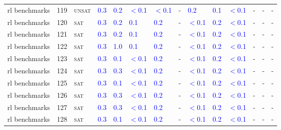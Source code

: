 \begin{center}
{\begin{longtable}{@{}llllllllllllll@{}}
rl benchmarks & 119 & \textsc{unsat} & \textcolor{blue}{0.3} & \textcolor{blue}{0.2} & \textcolor{blue}{$<$0.1} & \textcolor{blue}{$<$0.1} & - & \textcolor{blue}{0.2} & \textcolor{blue}{0.1} & \textcolor{blue}{$<$0.1} & - & - & - \\
rl benchmarks & 120 & \textsc{sat} & \textcolor{blue}{0.3} & \textcolor{blue}{0.2} & \textcolor{blue}{0.1} & \textcolor{blue}{0.2} & - & \textcolor{blue}{$<$0.1} & \textcolor{blue}{0.2} & \textcolor{blue}{$<$0.1} & - & - & - \\
rl benchmarks & 121 & \textsc{sat} & \textcolor{blue}{0.3} & \textcolor{blue}{0.2} & \textcolor{blue}{0.1} & \textcolor{blue}{0.2} & - & \textcolor{blue}{$<$0.1} & \textcolor{blue}{0.2} & \textcolor{blue}{$<$0.1} & - & - & - \\
rl benchmarks & 122 & \textsc{sat} & \textcolor{blue}{0.3} & \textcolor{blue}{1.0} & \textcolor{blue}{0.1} & \textcolor{blue}{0.2} & - & \textcolor{blue}{$<$0.1} & \textcolor{blue}{0.2} & \textcolor{blue}{$<$0.1} & - & - & - \\
rl benchmarks & 123 & \textsc{sat} & \textcolor{blue}{0.3} & \textcolor{blue}{0.1} & \textcolor{blue}{$<$0.1} & \textcolor{blue}{0.2} & - & \textcolor{blue}{$<$0.1} & \textcolor{blue}{0.2} & \textcolor{blue}{$<$0.1} & - & - & - \\
rl benchmarks & 124 & \textsc{sat} & \textcolor{blue}{0.3} & \textcolor{blue}{0.3} & \textcolor{blue}{$<$0.1} & \textcolor{blue}{0.2} & - & \textcolor{blue}{$<$0.1} & \textcolor{blue}{0.2} & \textcolor{blue}{$<$0.1} & - & - & - \\
rl benchmarks & 125 & \textsc{sat} & \textcolor{blue}{0.3} & \textcolor{blue}{0.1} & \textcolor{blue}{$<$0.1} & \textcolor{blue}{0.2} & - & \textcolor{blue}{$<$0.1} & \textcolor{blue}{0.2} & \textcolor{blue}{$<$0.1} & - & - & - \\
rl benchmarks & 126 & \textsc{sat} & \textcolor{blue}{0.3} & \textcolor{blue}{0.3} & \textcolor{blue}{$<$0.1} & \textcolor{blue}{0.2} & - & \textcolor{blue}{$<$0.1} & \textcolor{blue}{0.2} & \textcolor{blue}{$<$0.1} & - & - & - \\
rl benchmarks & 127 & \textsc{sat} & \textcolor{blue}{0.3} & \textcolor{blue}{0.3} & \textcolor{blue}{$<$0.1} & \textcolor{blue}{0.2} & - & \textcolor{blue}{$<$0.1} & \textcolor{blue}{0.2} & \textcolor{blue}{$<$0.1} & - & - & - \\
rl benchmarks & 128 & \textsc{sat} & \textcolor{blue}{0.3} & \textcolor{blue}{0.1} & \textcolor{blue}{$<$0.1} & \textcolor{blue}{0.2} & - & \textcolor{blue}{$<$0.1} & \textcolor{blue}{0.2} & \textcolor{blue}{$<$0.1} & - & - & - \\

\end{longtable}}
\end{center}
